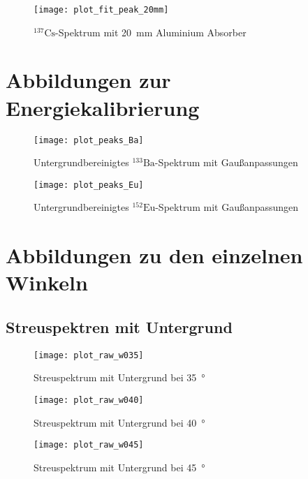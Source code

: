\documentclass[11pt, ngerman, fleqn, DIV=15, headinclude, BCOR=2cm]{scrreprt}
\begin{document}
\begin{appendix}
\begin{figure}[h]
    \centering
    \texttt{[image: plot\_fit\_peak\_20mm]}
    \caption{%
	    $^{137}\text{Cs}$-Spektrum mit \SI{20}{\milli\metre} Aluminium
	    Absorber
   }
    \label{fig:plot_fit_peak_20mm}
\end{figure}

\clearpage

\section{Abbildungen zur Energiekalibrierung} \label{anhang-energiekalibrierung}
\begin{figure}[h]
    \centering
    \texttt{[image: plot\_peaks\_Ba]}
    \caption{%
	    Untergrundbereinigtes $^{133}\text{Ba}$-Spektrum mit
	    Gaußanpassungen
   }
    \label{fig:plot_peaks_Ba}
\end{figure}

\begin{figure}[h]
    \centering
    \texttt{[image: plot\_peaks\_Eu]}
    \caption{%
	    Untergrundbereinigtes $^{152}\text{Eu}$-Spektrum mit
	    Gaußanpassungen
    }
    \label{fig:plot_peaks_Eu}
\end{figure}

\clearpage

\section{Abbildungen zu den einzelnen Winkeln}\label{anhang-streuspektren}
\subsection{Streuspektren mit Untergrund}
\label{anhang-streuspektren-untergrund}
\begin{figure}[h]
    \centering
    \texttt{[image: plot\_raw\_w035]}
    \caption{%
	    Streuspektrum mit Untergrund bei \SI{35}{\degree}
    }
    \label{fig:plot_raw_w035}
\end{figure}

\begin{figure}[h]
    \centering
    \texttt{[image: plot\_raw\_w040]}
    \caption{%
	    Streuspektrum mit Untergrund bei \SI{40}{\degree}
    }
    \label{fig:plot_raw_w040}
\end{figure}

\begin{figure}[h]
    \centering
    \texttt{[image: plot\_raw\_w045]}
    \caption{%
	    Streuspektrum mit Untergrund bei \SI{45}{\degree}
    }
    \label{fig:plot_raw_w045}
\end{figure}


\end{appendix}
\end{document}
